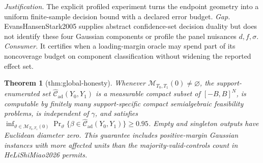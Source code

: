 \documentclass{article}
\newtheorem{theorem}{Theorem}
\begin{document}
\par\smallskip\noindent \textit{Justification.} The explicit profiled experiment turns the endpoint geometry into a uniform finite-sample decision bound with a declared error budget. \textit{Gap.} EvansHansenStark2005 supplies abstract confidence-set decision duality but does not identify these four Gaussian components or profile the panel nuisances \(d,f,\sigma\). \textit{Consumer.} It certifies when a loading-margin oracle may spend part of its noncoverage budget on component classification without widening the reported effect set.

\begin{theorem}[thm:global-honesty]\label{thm:global-honesty}
Whenever \(\mathcal M_{T_0,T_1}(0)\ne\varnothing\), the support-enumerated set \(\widehat{\mathcal C}_{\mathrm{ad}}(Y_0,Y_1)\) is a measurable compact subset of \([-B,B]^N\), is computable by finitely many support-specific compact semialgebraic feasibility problems, is independent of \(\gamma\), and satisfies \(\inf_{\vartheta\in\mathcal M_{T_0,T_1}(0)}\Pr_\vartheta\{\beta\in\widehat{\mathcal C}_{\mathrm{ad}}(Y_0,Y_1)\}\ge0.95\). Empty and singleton outputs have Euclidean diameter zero. This guarantee includes positive-margin Gaussian instances with more affected units than the majority-valid-controls count in HeLiShiMiao2026 permits.
\end{theorem}
\end{document}

